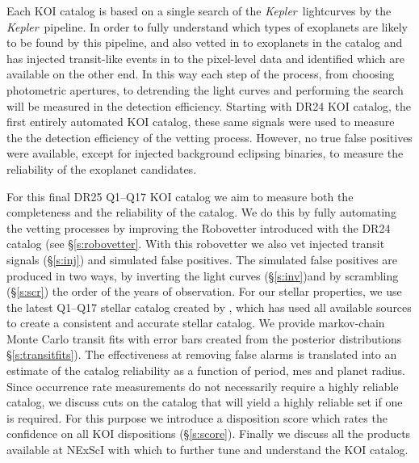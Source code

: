 \documentclass[onecolumn]{aastex6}
\newcommand\Kepler{\textit{Kepler}}
\begin{document}
Each KOI catalog is based on a single search of the \Kepler\ lightcurves by the \Kepler\ pipeline.  In order to fully understand which types of exoplanets are likely to be found by this pipeline, and also vetted in to exoplanets in the catalog \citet{Christiansen2016} and \citet{Christiansen2015} has injected transit-like events in to the pixel-level data and identified which are available on the other end. In this way each step of the process, from choosing photometric apertures, to detrending the light curves and performing the search will be measured in the detection efficiency. Starting with DR24 KOI catalog, the first entirely automated KOI catalog, these same signals were used to measure the the detection efficiency of the vetting process. However, no true false positives were available, except for injected background eclipsing binaries, to measure the reliability of the exoplanet candidates.

For this final DR25 Q1--Q17 KOI catalog we aim to measure both the completeness and the reliability of the catalog.  We do this by fully automating the vetting processes by improving the Robovetter introduced with the DR24 catalog (see \S\ref{s:robovetter}. With this robovetter we also vet injected transit signals (\S\ref{s:inj}) and simulated false positives. The simulated false positives are produced in two ways, by inverting the light curves (\S\ref{s:inv})and by scrambling (\S\ref{s:scr}) the order of the years of observation. For our stellar properties, we use the latest Q1--Q17 stellar catalog created by \citep{mathur2016}, which has used all available sources to create a consistent and accurate stellar catalog. We provide markov-chain Monte Carlo transit fits \citep{Rowe2015} with error bars created from the posterior distributions \S\ref{s:transitfits}). The effectiveness at removing false alarms is translated into an estimate of the catalog reliability as a function of period, mes and planet radius. Since occurrence rate measurements do not necessarily require a highly reliable catalog, we discuss cuts on the catalog that will yield a highly reliable set if one is required. For this purpose we introduce a disposition score which rates the confidence on all KOI dispositions (\S\ref{s:score}). Finally we discuss all the products available at NExScI with which to further tune and understand the KOI catalog.
\end{document}
